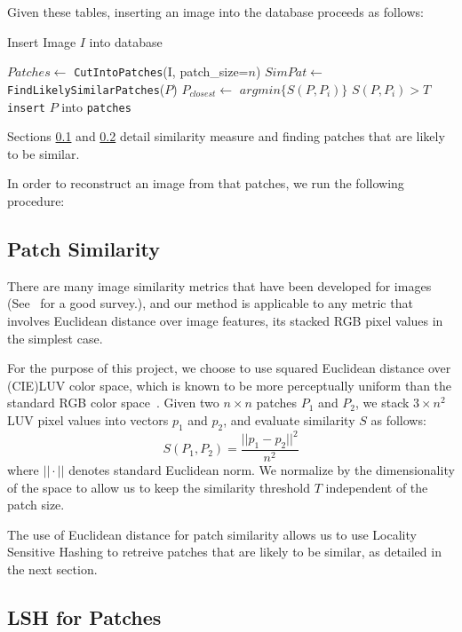 Given these tables, inserting an image into the database proceeds as follows:

\begin{algorithm}
    \caption{Insert Image $I$ into database}
    \label{alg:insert}
\begin{algorithmic}[1]
\State $Patches \leftarrow $ \texttt{CutIntoPatches}(I, patch\_size=$n$)
\State $SimPat \leftarrow $\texttt{FindLikelySimilarPatches}($P$)
\State $P_{closest} \leftarrow $ $argmin \{ S(P, P_i) \}$
\If $S(P, P_i) > T$
\State \texttt{insert} $P$ into \texttt{patches}
\EndIf
\EndFor
\vspace{3mm}
\end{algorithmic}
\end{algorithm}
Sections \ref{ssec:sim} and \ref{ssec:lsh} detail similarity measure and
finding patches that are likely to be similar.

In order to reconstruct an image from that patches, we run the following
procedure:



\subsection{Patch Similarity}\label{ssec:sim}
There are many image similarity metrics that have been developed for
images (See~\cite{yasmin2013use} for a good survey.), and
our method is applicable to any metric that involves Euclidean
distance over image features, its stacked RGB pixel values
in the simplest case.

For the purpose of this project, we choose to use squared Euclidean
distance over (CIE)LUV color space, which is known to be more perceptually
uniform than the standard RGB color space~\cite{kekre2012performance}.
Given two $n \times n$ patches $P_1$ and $P_2$, we stack $3 \times n^2$ LUV pixel values
into vectors $p_1$ and $p_2$, and evaluate similarity $S$ as follows:
\begin{displaymath}
S(P_1, P_2) = \frac{||p_1 - p_2||^2}{n^2}
\end{displaymath}
where $||\cdot||$ denotes standard Euclidean norm.
We normalize by the dimensionality of the space to allow us to keep the
similarity threshold $T$ independent of the patch size.

The use of Euclidean distance for patch similarity
allows us to use Locality Sensitive Hashing to retreive patches
that are likely to be similar, as detailed in the
next section.

\subsection{LSH for Patches}\label{ssec:lsh}

